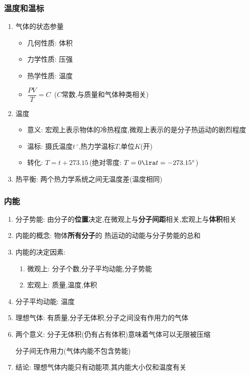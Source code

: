 \documentclass{article}
\begin{document}
\subsubsection{温度和温标}
\begin{enumerate}
    \item 气体的状态参量
          \begin{itemize}
              \item 几何性质: 体积
              \item 力学性质: 压强
              \item 热学性质: 温度
              \item $\dfrac{PV}{T} = C \,$ ($C$常数,与质量和气体种类相关)
          \end{itemize}
    \item 温度
          \begin{itemize}
              \item 意义: 宏观上表示物体的冷热程度,微观上表示的是分子热运动的剧烈程度
              \item 温标: 摄氏温度$t \, ^{\circ}$,热力学温标$T$,单位$K$(开)
              \item 转化: $T = t + 273.15 \,$(绝对零度: $T = 0 \lra t = -273.15^{\circ} $)
          \end{itemize}
    \item 热平衡: 两个热力学系统之间无温度差(温度相同)
\end{enumerate}

\vspace{2em}

\subsubsection{内能}
\begin{enumerate}
    \item 分子势能: 由分子的\textbf{位置}决定,在微观上与\textbf{分子间距}相关,宏观上与\textbf{体积}相关
    \item 内能的概念: 物体\textbf{所有分子}的 热运动的动能与分子势能的总和
    \item 内能的决定因素:
          \begin{enumerate}[label = (\arabic*)]
              \item 微观上: 分子个数,分子平均动能,分子势能
              \item 宏观上: 质量,温度,体积
          \end{enumerate}
    \item 分子平均动能: 温度
    \item 理想气体: 有质量,分子无体积,分子之间没有作用力的气体
    \item 两个意义: 分子无体积(仍有占有体积)意味着气体可以无限被压缩

          \hspace{4.7em}分子间无作用力(气体内能不包含势能)
    \item 结论: 理想气体内能只有动能项,其内能大小仅和温度有关
\end{enumerate}
\end{document}
